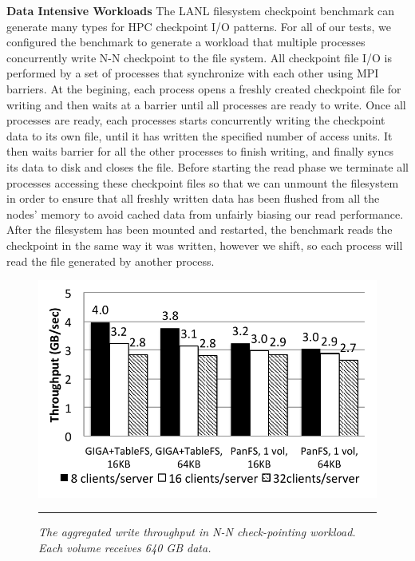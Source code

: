 
\textbf{Data Intensive Workloads}
The LANL filesystem checkpoint benchmark can
generate many types for HPC checkpoint I/O patterns.
For all of our tests, we configured the benchmark to generate a workload
that multiple processes concurrently write N-N checkpoint to the file system.
All checkpoint file I/O is performed by a set of processes
that synchronize with each other using MPI barriers.
At the begining, each process opens a freshly created checkpoint file
for writing and then waits at a barrier until all processes are ready to write.
Once all processes are ready, each processes starts
concurrently writing the checkpoint data to its own file,
until it has written the specified number of access units.
It then waits barrier for all the other processes to finish writing,
and finally syncs its data to disk and closes the file.
Before starting the read phase we terminate all processes
accessing these checkpoint files so that
we can unmount the filesystem in order to ensure that
all freshly written data has been flushed from all the nodes'
memory to avoid cached data from unfairly biasing our read performance.
After the filesystem has been mounted and restarted,
the benchmark reads the checkpoint in the same way it was written,
however we shift, so each process will read
the file generated by another process.

\begin{figure}[t]  %
\centerline{\includegraphics[scale=0.7]{./figs/checkpointing_write}}
\vspace{10pt}
\caption{\normalsize
\textit{
The aggregated write throughput in N-N check-pointing workload.
Each volume receives 640 GB data.
}
}
\vspace{10pt}
\hrule
\label{graph:checkpoint_write}
\end{figure}       %

